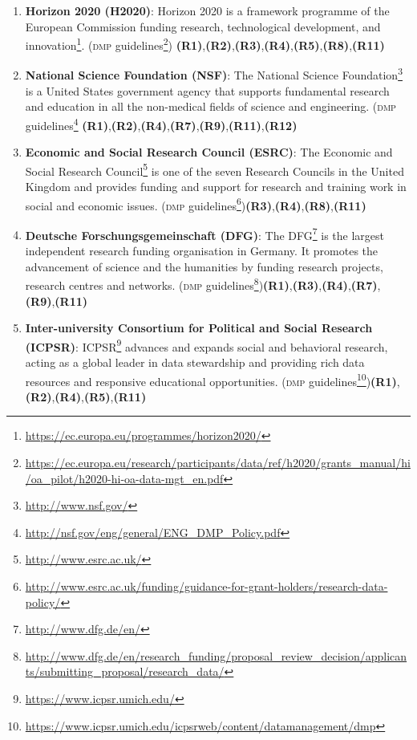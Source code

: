 \documentclass[runningheads,a4paper]{llncs}
\newcommand{\dmp}{{\scshape dmp}\xspace}
\newcommand\footnoteurl[1]{\footnote{\scriptsize\url{#1}}}
\begin{document}
\begin{enumerate}
\item \textbf{Horizon 2020 (H2020)}: Horizon 2020 is a framework programme of the European Commission funding research, technological development, and innovation\footnoteurl{https://ec.europa.eu/programmes/horizon2020/}. (\dmp guidelines\footnoteurl{https://ec.europa.eu/research/participants/data/ref/h2020/grants_manual/hi/oa_pilot/h2020-hi-oa-data-mgt_en.pdf}) \textbf{(R1)},\textbf{(R2)},\textbf{(R3)},\textbf{(R4)},\textbf{(R5)},\textbf{(R8)},\textbf{(R11)}\label{fbitem:h2020}\\

\item \textbf{National Science Foundation (NSF)}: The National Science Foundation\footnoteurl{http://www.nsf.gov/} is a United States government agency that supports fundamental research and education in all the non-medical fields of science and engineering. (\dmp guidelines\footnoteurl{http://nsf.gov/eng/general/ENG_DMP_Policy.pdf} \textbf{(R1)},\textbf{(R2)},\textbf{(R4)},\textbf{(R7)},\textbf{(R9)},\textbf{(R11)},\textbf{(R12)}\label{fbitem:nsf}\\

\item \textbf{Economic and Social Research Council (ESRC)}: The Economic and Social Research Council\footnoteurl{http://www.esrc.ac.uk/} is one of the seven Research Councils in the United Kingdom and provides funding and support for research and training work in social and economic issues. (\dmp guidelines\footnoteurl{http://www.esrc.ac.uk/funding/guidance-for-grant-holders/research-data-policy/})\textbf{(R3)},\textbf{(R4)},\textbf{(R8)},\textbf{(R11)}\label{fbitem:esrc}\\

\item \textbf{Deutsche Forschungsgemeinschaft (DFG)}: The DFG\footnoteurl{http://www.dfg.de/en/} is the largest independent research funding organisation in Germany. It promotes the advancement of science and the humanities by funding research projects, research centres and networks. (\dmp guidelines\footnoteurl{http://www.dfg.de/en/research_funding/proposal_review_decision/applicants/submitting_proposal/research_data/})\textbf{(R1)},\textbf{(R3)},\textbf{(R4)},\textbf{(R7)}, \textbf{(R9)},\textbf{(R11)}\label{fbitem:dfg}\\

\item \textbf{Inter-university Consortium for Political and Social Research (ICPSR)}: ICPSR\footnoteurl{https://www.icpsr.umich.edu/} advances and expands social and behavioral research, acting as a global leader in data stewardship and providing rich data resources and responsive educational opportunities. (\dmp guidelines\footnoteurl{https://www.icpsr.umich.edu/icpsrweb/content/datamanagement/dmp})\textbf{(R1)},\textbf{(R2)},\textbf{(R4)},\textbf{(R5)},\textbf{(R11)}\label{fbitem:icpsr}\\


\end{enumerate}
\end{document}

